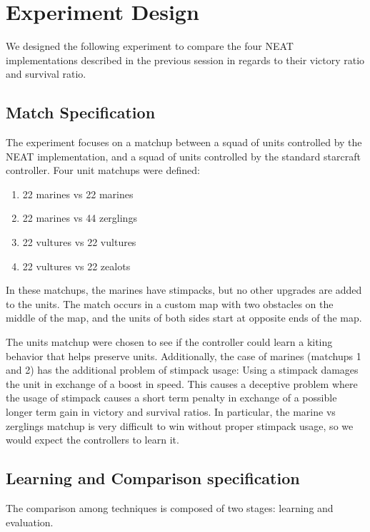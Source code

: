 \section{Experiment Design}

We designed the following experiment to compare the four NEAT
implementations described in the previous session in regards to their
victory ratio and survival ratio.

\subsection{Match Specification}

The experiment focuses on a matchup between a squad of units
controlled by the NEAT implementation, and a squad of units controlled
by the standard starcraft controller. Four unit matchups were defined:
\begin{enumerate}
    \item 22 marines vs 22 marines
    \item 22 marines vs 44 zerglings
    \item 22 vultures vs 22 vultures
    \item 22 vultures vs 22 zealots
\end{enumerate}

In these matchups, the marines have stimpacks, but no other upgrades
are added to the units. The match occurs in a custom map with two obstacles
on the middle of the map, and the units of both sides start at
opposite ends of the map.

The units matchup were chosen to see if the controller could learn a
kiting behavior that helps preserve units. Additionally, the case of
marines (matchups 1 and 2) has the additional problem of stimpack
usage: Using a stimpack damages the unit in exchange of a boost in
speed. This causes a deceptive problem where the usage of stimpack
causes a short term penalty in exchange of a possible longer term gain
in victory and survival ratios. In particular, the marine vs zerglings
matchup is very difficult to win without proper stimpack usage, so we
would expect the controllers to learn it.

\subsection{Learning and Comparison specification}

The comparison among techniques is composed of two stages: learning
and evaluation.

